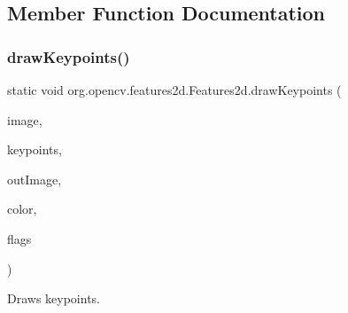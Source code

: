\subsection{Member Function Documentation}
\mbox{\label{classorg_1_1opencv_1_1features2d_1_1_features2d_a68577b64280ca50c49d9d34e8bfaf669}} 
\subsubsection{\texorpdfstring{draw\+Keypoints()}{drawKeypoints()}\hspace{0.1cm}{\footnotesize\ttfamily [1/2]}}
{\footnotesize\ttfamily static void org.\+opencv.\+features2d.\+Features2d.\+draw\+Keypoints (\begin{DoxyParamCaption}\item[{\mbox{\hyperlink{classorg_1_1opencv_1_1core_1_1_mat}{Mat}}}]{image,  }\item[{\mbox{\hyperlink{classorg_1_1opencv_1_1core_1_1_mat_of_key_point}{Mat\+Of\+Key\+Point}}}]{keypoints,  }\item[{\mbox{\hyperlink{classorg_1_1opencv_1_1core_1_1_mat}{Mat}}}]{out\+Image,  }\item[{\mbox{\hyperlink{classorg_1_1opencv_1_1core_1_1_scalar}{Scalar}}}]{color,  }\item[{int}]{flags }\end{DoxyParamCaption})\hspace{0.3cm}{\ttfamily [static]}}

Draws keypoints.



